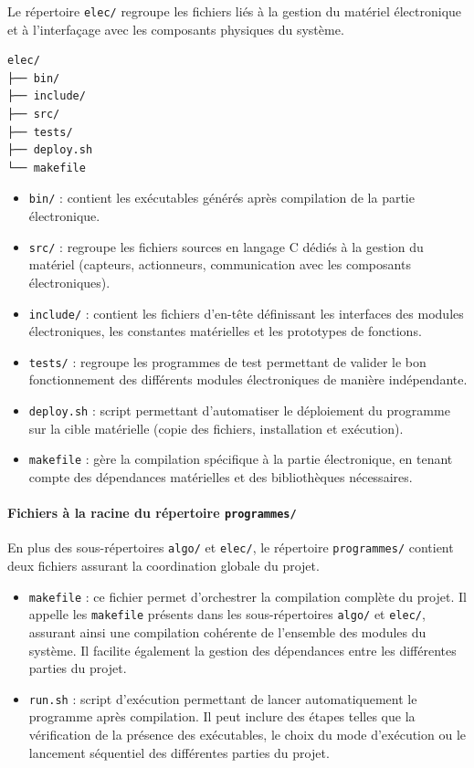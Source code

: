 Le répertoire \texttt{elec/} regroupe les fichiers liés à la gestion du matériel électronique
et à l’interfaçage avec les composants physiques du système.

\begin{verbatim}
elec/
├── bin/
├── include/
├── src/
├── tests/
├── deploy.sh
└── makefile
\end{verbatim}

\begin{itemize}
    \item \texttt{bin/} : contient les exécutables générés après compilation de la partie électronique.
    
    \item \texttt{src/} : regroupe les fichiers sources en langage C dédiés à la gestion du matériel
    (capteurs, actionneurs, communication avec les composants électroniques).
    
    \item \texttt{include/} : contient les fichiers d’en-tête définissant les interfaces des modules électroniques,
    les constantes matérielles et les prototypes de fonctions.
    
    \item \texttt{tests/} : regroupe les programmes de test permettant de valider le bon fonctionnement
    des différents modules électroniques de manière indépendante.
    
    \item \texttt{deploy.sh} : script permettant d’automatiser le déploiement du programme
    sur la cible matérielle (copie des fichiers, installation et exécution).
    
    \item \texttt{makefile} : gère la compilation spécifique à la partie électronique,
    en tenant compte des dépendances matérielles et des bibliothèques nécessaires.
\end{itemize}
\paragraph{Fichiers à la racine du répertoire \texttt{programmes/}}

En plus des sous-répertoires \texttt{algo/} et \texttt{elec/}, le répertoire \texttt{programmes/}
contient deux fichiers assurant la coordination globale du projet.

\begin{itemize}
    \item \texttt{makefile} : ce fichier permet d’orchestrer la compilation complète du projet.
    Il appelle les \texttt{makefile} présents dans les sous-répertoires \texttt{algo/} et \texttt{elec/},
    assurant ainsi une compilation cohérente de l’ensemble des modules du système.
    Il facilite également la gestion des dépendances entre les différentes parties du projet.

    \item \texttt{run.sh} : script d’exécution permettant de lancer automatiquement le programme
    après compilation. Il peut inclure des étapes telles que la vérification de la présence des exécutables,
    le choix du mode d’exécution ou le lancement séquentiel des différentes parties du projet.
\end{itemize}
